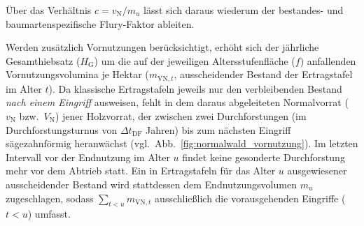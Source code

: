 \documentclass[twocolumn, paper=a4, fontsize=10pt]{scrartcl}
\begin{document}
Über das Verhältnis $c = v_{\text{N}} / m_u$ lässt sich daraus wiederum der bestandes- und baumartenspezifische Flury-Faktor ableiten.

Werden zusätzlich Vornutzungen berücksichtigt, erhöht sich der jährliche Gesamthiebsatz ($H_{\text{G}}$) um die auf der jeweiligen Altersstufenfläche ($f$) anfallenden Vornutzungsvolumina je Hektar ($m_{\text{VN},t}$, ausscheidender Bestand der Ertragstafel im Alter $t$). Da klassische Ertragstafeln jeweils nur den verbleibenden Bestand \emph{nach einem Eingriff} ausweisen, fehlt in dem daraus abgeleiteten Normalvorrat ($v_{\text{N}}$ bzw.\ $V_{\text{N}}$) jener Holzvorrat, der zwischen zwei Durchforstungen (im Durchforstungsturnus von $\Delta t_{\text{DF}}$ Jahren) bis zum nächsten Eingriff sägezahnförmig heranwächst (vgl.\ Abb.~\ref{fig:normalwald_vornutzung}). Im letzten Intervall vor der Endnutzung im Alter $u$ findet keine gesonderte Durchforstung mehr vor dem Abtrieb statt. Ein in Ertragstafeln für das Alter $u$ ausgewiesener ausscheidender Bestand wird stattdessen dem Endnutzungsvolumen $m_u$ zugeschlagen, sodass $\sum_{t < u} m_{\text{VN},t}$ ausschließlich die vorausgehenden Eingriffe ($t < u$) umfasst.
\end{document}
